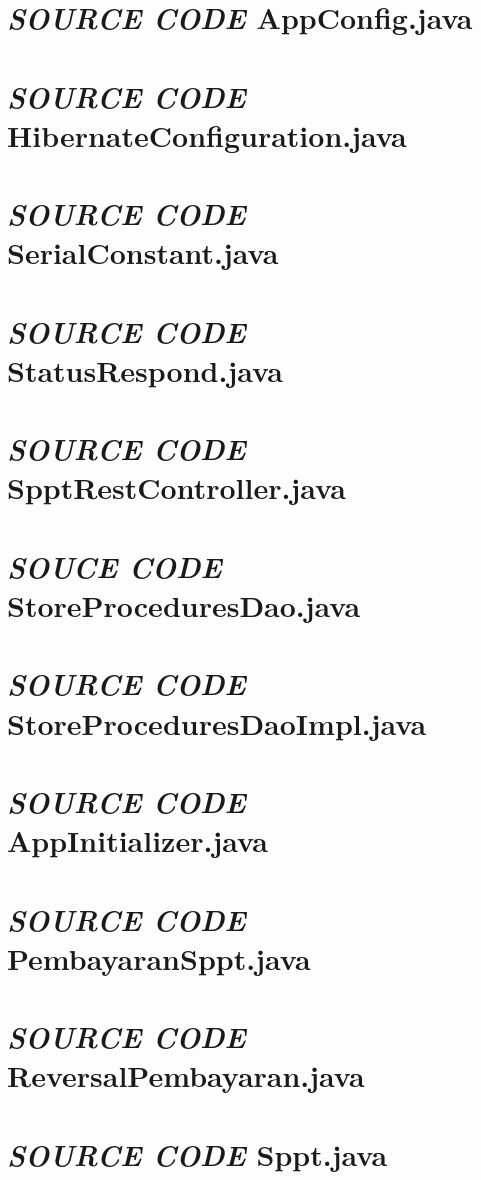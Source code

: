 \documentclass[pdftex,12pt, oneside]{article}
\begin{document}
\section{\textit{SOURCE CODE} AppConfig.java}


\section{\textit{SOURCE CODE} HibernateConfiguration.java}


\section{\textit{SOURCE CODE} SerialConstant.java}


\section{\textit{SOURCE CODE} StatusRespond.java}


\section{\textit{SOURCE CODE} SpptRestController.java}


\section{\textit{SOUCE CODE} StoreProceduresDao.java}


\section{\textit{SOURCE CODE} StoreProceduresDaoImpl.java}


\section{\textit{SOURCE CODE} AppInitializer.java}


\section{\textit{SOURCE CODE} PembayaranSppt.java}


\section{\textit{SOURCE CODE} ReversalPembayaran.java}


\section{\textit{SOURCE CODE} Sppt.java}
\end{document}
